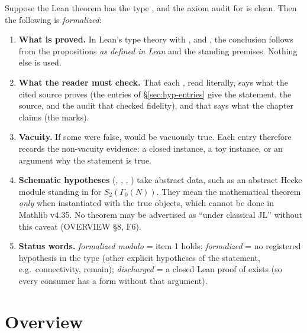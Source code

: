 \begin{readbox}\label{box:hyp-read}
\small Suppose the Lean theorem  has the type
, and
the axiom audit for  is clean. Then the following is \emph{formalized}:
\begin{enumerate}[leftmargin=1.4em]
\item \textbf{What is proved.} In Lean's type theory with ,  and
  , the conclusion  follows from the propositions  \emph{as defined in
  Lean} and the standing premises. Nothing else is used.
\item \textbf{What the reader must check.} That each , read literally, says what the cited source
  proves (the entries of \S\ref{sec:hyp-entries} give the statement, the source, and the audit that checked
  fidelity), and that  says what the chapter claims (the  marks).
\item \textbf{Vacuity.} If some  were false,  would be vacuously true. Each entry therefore
  records the non-vacuity evidence: a closed instance, a toy instance, or an argument why the statement is true.
\item \textbf{Schematic hypotheses} (, , , )
  take abstract data, such as an abstract Hecke module standing in for $S_2(\Gamma_0(N))$. They mean the
  mathematical theorem \emph{only} when instantiated with the true objects, which cannot be done in Mathlib v4.35.
  No theorem may be advertised as ``under classical JL'' without this caveat (OVERVIEW \S8, F6).
\item \textbf{Status words.} \emph{formalized modulo } = item 1 holds;
  \emph{formalized} = no registered hypothesis in the type (other explicit hypotheses of the statement, e.g.\ connectivity,
  remain); \emph{discharged} = a closed Lean proof of  exists (so every consumer has a form without that argument).
\end{enumerate}
\end{readbox}

\section{Overview}\label{sec:hyp-overview}

